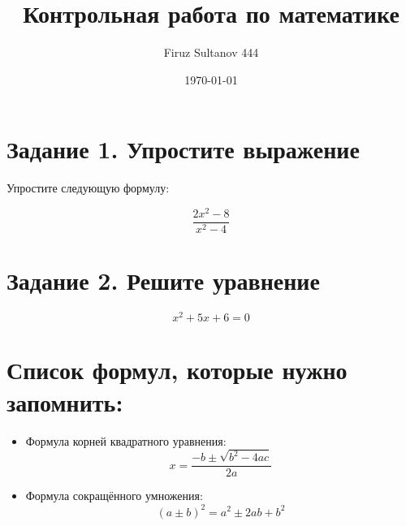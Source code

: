 \documentclass[12pt]{article}
\title{Контрольная работа по математике}
\author{Firuz Sultanov 444}
\date{\today}
\begin{document}
\maketitle

\section*{Задание 1. Упростите выражение}

Упростите следующую формулу:

\[
\frac{2x^2 - 8}{x^2 - 4}
\]

\section*{Задание 2. Решите уравнение}

\[
x^2 + 5x + 6 = 0
\]

\section*{Список формул, которые нужно запомнить:}

\begin{itemize}
  \item Формула корней квадратного уравнения:
  \[
  x = \frac{-b \pm \sqrt{b^2 - 4ac}}{2a}
  \]
  \item Формула сокращённого умножения:
  \[
  (a \pm b)^2 = a^2 \pm 2ab + b^2
  \]
\end{itemize}
\end{document}
